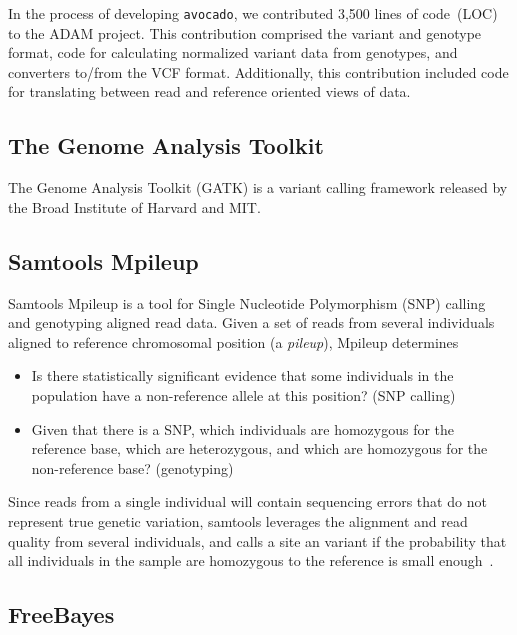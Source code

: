 \documentclass{acm_proc_article-sp}
\begin{document}
In the process of developing \texttt{avocado}, we contributed 3,500 lines of code~(LOC) to the ADAM project. This contribution comprised
the variant and genotype format, code for calculating normalized variant data from genotypes, and converters to/from the VCF format.
Additionally, this contribution included code for translating between read and reference oriented views of data.

\subsection{The Genome Analysis Toolkit}
\label{sec:gatk}

The Genome Analysis Toolkit (GATK) \cite{mckenna10, depristo11}
is a variant calling framework released by the Broad Institute of Harvard and MIT.


\subsection{Samtools Mpileup}
\label{sec:samtools}

Samtools Mpileup is a tool for Single Nucleotide Polymorphism (SNP) calling and genotyping aligned read data.  Given a set of
reads from several individuals aligned to reference chromosomal position (a \emph{pileup}), Mpileup determines
\begin{itemize}
\item Is there statistically significant evidence that some individuals in the population have a non-reference allele at this position? (SNP calling)
\item Given that there is a SNP, which individuals are homozygous for the reference base, which are heterozygous, and which are homozygous
for the non-reference base? (genotyping)
\end{itemize}
Since reads from a single individual will contain sequencing errors that do not represent true genetic variation, samtools leverages
the alignment and read quality from several individuals, and calls a site an variant if  the probability that all individuals in the sample
are homozygous to the reference is small enough~\cite{li11}.

\subsection{FreeBayes}
\label{sec:freebayes}

\cite{garrison12}
\end{document}
